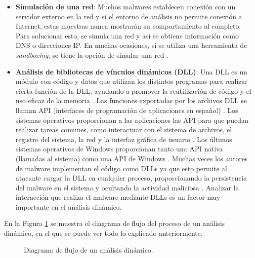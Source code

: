 \begin{itemize}
    \item \textbf{Simulación de una red}: Muchos malwares establecen conexión con un servidor externo en la red y si el entorno de análisis no permite conexión a Internet, estas muestras nunca mostrarán su comportamiento al completo. Para solucionar esto, se simula una red y así se obtiene información como \gls{DNS} o direcciones \gls{IP}. En muchas ocasiones, si se utiliza una herramienta de \textit{sandboxing}, se tiene la opción de simular una red \cite{PMA2012}.
    \item \textbf{Análisis de bibliotecas de vínculos dinámicos (\gls{DLL})}: Una \gls{DLL} es un módulo con código y datos que utilizan los distintos programas para realizar cierta función de la \gls{DLL}, ayudando a promover la reutilización de código y el uso eficaz de la memoria \cite{DLL2020}. Las funciones exportadas por los archivos \gls{DLL} se llaman \gls{API} (interfaces de programación de aplicaciones en español) \cite{75}.  Los sistemas operativos proporcionan a las aplicaciones las \gls{API} para que puedan realizar tareas comunes, como interactuar con el sistema de archivos, el registro del sistema, la red y la interfaz gráfica de usuario \cite{113}. Los últimos sistemas operativos de Windows proporcionan tanto una \gls{API} nativa (llamadas al sistema) como una \gls{API} de Windows \cite{119}. Muchas veces los autores de malware implementan el código como \gls{DLL}s ya que esto permite al atacante cargar la \gls{DLL} en cualquier proceso, proporcionando la persistencia del malware en el sistema y ocultando la actividad maliciosa \cite{LMA2018}. Analizar la interacción que realiza el malware mediante \gls{DLL}s es un factor muy importante en el análisis dinámico.
\end{itemize}

En la Figura \ref{fig:dinamFlow} se muestra el diagrama de flujo del proceso de un análisis dinámico, en el que se puede ver todo lo explicado anteriormente.

\begin{figure}[h!]
\begin{center}
{}
\end{center}
\caption{Diagrama de flujo de un análisis dinámico.}
\label{fig:dinamFlow}
\end{figure}

